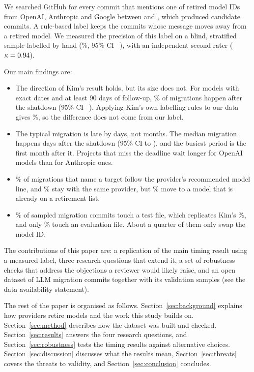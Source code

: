 We searched GitHub for every commit that mentions one of \ModelIds{} retired model IDs from OpenAI, Anthropic and Google between \MiningStart{} and \MiningEnd, which produced \Candidates{} candidate commits. A rule-based label keeps the \MigrationsAway{} commits whose message moves away from a retired model. We measured the precision of this label on a blind, stratified sample labelled by hand (\Precision\%, 95\% CI \PrecisionLow--\PrecisionHigh), with an independent second rater ($\kappa = 0.94$).

Our main findings are:
\begin{itemize}
\item The direction of Kim's result holds, but its size does not. For models with exact dates and at least 90 days of follow-up, \AfterLate\% of migrations happen after the shutdown (95\% CI \AfterLateLow--\AfterLateHigh). Applying Kim's own labelling rules to our data gives \AfterKimLabel\%, so the difference does not come from our label.
\item The typical migration is late by days, not months. The median migration happens \ExactDays{} days after the shutdown (95\% CI \ExactDaysLow{} to \ExactDaysHigh), and the busiest period is the first month after it. Projects that miss the deadline wait longer for OpenAI models than for Anthropic ones.
\item \FollowsLine\% of migrations that name a target follow the provider's recommended model line, and \SameProvider\% stay with the same provider, but \TargetOnList\% move to a model that is already on a retirement list.
\item \TouchTest\% of sampled migration commits touch a test file, which replicates Kim's \KimTouchTest\%, and only \TouchEval\% touch an evaluation file. About a quarter of them only swap the model ID.
\end{itemize}

The contributions of this paper are: a replication of the main timing result using a measured label, three research questions that extend it, a set of robustness checks that address the objections a reviewer would likely raise, and an open dataset of LLM migration commits together with its validation samples (see the data availability statement).

The rest of the paper is organised as follows. Section~\ref{sec:background} explains how providers retire models and the work this study builds on. Section~\ref{sec:method} describes how the dataset was built and checked. Section~\ref{sec:results} answers the four research questions, and Section~\ref{sec:robustness} tests the timing results against alternative choices. Section~\ref{sec:discussion} discusses what the results mean, Section~\ref{sec:threats} covers the threats to validity, and Section~\ref{sec:conclusion} concludes.
